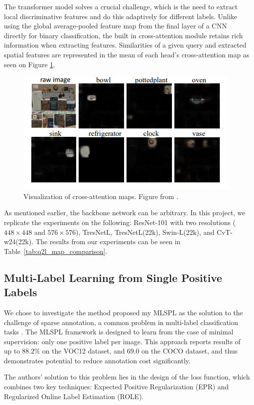 \documentclass[lettersize,journal]{IEEEtran}
\begin{document}
The transformer model solves a crucial challenge, which is the need to extract local discriminative features and do this adaptively for different labels. Unlike using the global average-pooled feature map from the final layer of a CNN directly for binary classification, the built in cross-attention module retains rich information when extracting features. Similarities of a given query and extracted spatial features are represented in the mean of each head's cross-attention map as seen on Figure \ref{fig:q2l_attention}.

\begin{figure}[t]
    \centering
    \includegraphics[width=.8\linewidth]{images/q2l_attention.PNG}
    \caption{Visualization of cross-attention maps. Figure from \cite{Query2Label}. }
    \label{fig:q2l_attention}
\end{figure}

As mentioned earlier, the backbone network can be arbitrary. In this project, we replicate the experiments on the following: ResNet-101 with two resolutions ($448\times 448$ and $576\times 576$), TresNetL, TresNetL(22k), Swin-L(22k), and CvT-w24(22k). The results from our experiments can be seen in Table~\ref{tab:q2l_map_comparison}.

\subsection{Multi-Label Learning from Single Positive Labels}
We chose to investigate the method proposed my MLSPL as the solution to the challenge of sparse annotation, a common problem in multi-label classification tasks \cite{mlsp}. The MLSPL framework is designed to learn from the case of minimal supervision: only one positive label per image. This approach reports results of up to $88.2\%$ on the VOC12 dataset, and $69.0$ on the COCO dataset, and thus demonstrates potential to reduce annotation cost significantly.

The authors' solution to this problem lies in the design of the loss function, which combines two key techniques: Expected Positive Regularization (EPR) and Regularized Online Label Estimation (ROLE).
\end{document}
